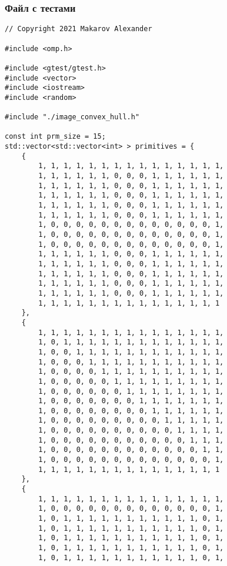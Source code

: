 \documentclass{report}
\begin{document}
\subsubsection{Файл с тестами}
\begin{lstlisting}
// Copyright 2021 Makarov Alexander

#include <omp.h>

#include <gtest/gtest.h>
#include <vector>
#include <iostream>
#include <random>

#include "./image_convex_hull.h"

const int prm_size = 15;
std::vector<std::vector<int> > primitives = {
    {
        1, 1, 1, 1, 1, 1, 1, 1, 1, 1, 1, 1, 1, 1, 1,
        1, 1, 1, 1, 1, 1, 0, 0, 0, 1, 1, 1, 1, 1, 1,
        1, 1, 1, 1, 1, 1, 0, 0, 0, 1, 1, 1, 1, 1, 1,
        1, 1, 1, 1, 1, 1, 0, 0, 0, 1, 1, 1, 1, 1, 1,
        1, 1, 1, 1, 1, 1, 0, 0, 0, 1, 1, 1, 1, 1, 1,
        1, 1, 1, 1, 1, 1, 0, 0, 0, 1, 1, 1, 1, 1, 1,
        1, 0, 0, 0, 0, 0, 0, 0, 0, 0, 0, 0, 0, 0, 1,
        1, 0, 0, 0, 0, 0, 0, 0, 0, 0, 0, 0, 0, 0, 1,
        1, 0, 0, 0, 0, 0, 0, 0, 0, 0, 0, 0, 0, 0, 1,
        1, 1, 1, 1, 1, 1, 0, 0, 0, 1, 1, 1, 1, 1, 1,
        1, 1, 1, 1, 1, 1, 0, 0, 0, 1, 1, 1, 1, 1, 1,
        1, 1, 1, 1, 1, 1, 0, 0, 0, 1, 1, 1, 1, 1, 1,
        1, 1, 1, 1, 1, 1, 0, 0, 0, 1, 1, 1, 1, 1, 1,
        1, 1, 1, 1, 1, 1, 0, 0, 0, 1, 1, 1, 1, 1, 1,
        1, 1, 1, 1, 1, 1, 1, 1, 1, 1, 1, 1, 1, 1, 1
    },
    {
        1, 1, 1, 1, 1, 1, 1, 1, 1, 1, 1, 1, 1, 1, 1,
        1, 0, 1, 1, 1, 1, 1, 1, 1, 1, 1, 1, 1, 1, 1,
        1, 0, 0, 1, 1, 1, 1, 1, 1, 1, 1, 1, 1, 1, 1,
        1, 0, 0, 0, 1, 1, 1, 1, 1, 1, 1, 1, 1, 1, 1,
        1, 0, 0, 0, 0, 1, 1, 1, 1, 1, 1, 1, 1, 1, 1,
        1, 0, 0, 0, 0, 0, 1, 1, 1, 1, 1, 1, 1, 1, 1,
        1, 0, 0, 0, 0, 0, 0, 1, 1, 1, 1, 1, 1, 1, 1,
        1, 0, 0, 0, 0, 0, 0, 0, 1, 1, 1, 1, 1, 1, 1,
        1, 0, 0, 0, 0, 0, 0, 0, 0, 1, 1, 1, 1, 1, 1,
        1, 0, 0, 0, 0, 0, 0, 0, 0, 0, 1, 1, 1, 1, 1,
        1, 0, 0, 0, 0, 0, 0, 0, 0, 0, 0, 1, 1, 1, 1,
        1, 0, 0, 0, 0, 0, 0, 0, 0, 0, 0, 0, 1, 1, 1,
        1, 0, 0, 0, 0, 0, 0, 0, 0, 0, 0, 0, 0, 1, 1,
        1, 0, 0, 0, 0, 0, 0, 0, 0, 0, 0, 0, 0, 0, 1,
        1, 1, 1, 1, 1, 1, 1, 1, 1, 1, 1, 1, 1, 1, 1
    },
    {
        1, 1, 1, 1, 1, 1, 1, 1, 1, 1, 1, 1, 1, 1, 1,
        1, 0, 0, 0, 0, 0, 0, 0, 0, 0, 0, 0, 0, 0, 1,
        1, 0, 1, 1, 1, 1, 1, 1, 1, 1, 1, 1, 1, 0, 1,
        1, 0, 1, 1, 1, 1, 1, 1, 1, 1, 1, 1, 1, 0, 1,
        1, 0, 1, 1, 1, 1, 1, 1, 1, 1, 1, 1, 1, 0, 1,
        1, 0, 1, 1, 1, 1, 1, 1, 1, 1, 1, 1, 1, 0, 1,
        1, 0, 1, 1, 1, 1, 1, 1, 1, 1, 1, 1, 1, 0, 1,

\end{lstlisting}
\end{document}
